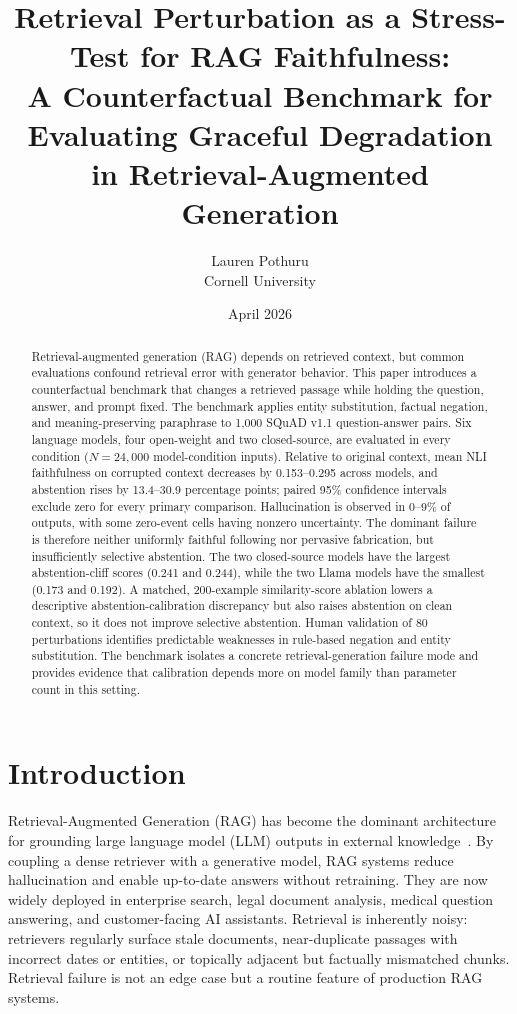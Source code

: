 \documentclass[11pt]{article}
\title{\textbf{Retrieval Perturbation as a Stress-Test for RAG Faithfulness:}\\
A Counterfactual Benchmark for Evaluating Graceful Degradation\\
in Retrieval-Augmented Generation}
\author{Lauren Pothuru\\Cornell University}
\date{April 2026}
\begin{document}
\maketitle

\FloatBarrier
\begin{abstract}
Retrieval-augmented generation (RAG) depends on retrieved context, but common evaluations
confound retrieval error with generator behavior. This paper introduces a counterfactual
benchmark that changes a retrieved passage while holding the question, answer, and prompt
fixed. The benchmark applies entity substitution, factual negation, and meaning-preserving
paraphrase to 1{,}000 SQuAD v1.1 question-answer pairs. Six language models, four
open-weight and two closed-source, are evaluated in every condition ($N=24{,}000$
model-condition inputs). Relative to original context, mean NLI faithfulness on corrupted
context decreases by 0.153--0.295 across models, and abstention rises by 13.4--30.9
percentage points; paired 95\% confidence intervals exclude zero for every primary
comparison. Hallucination is observed in 0--9\% of outputs, with some zero-event cells
having nonzero uncertainty. The dominant failure is therefore neither uniformly faithful
following nor pervasive fabrication, but insufficiently selective abstention. The two
closed-source models have the largest abstention-cliff scores (0.241 and 0.244), while
the two Llama models have the smallest (0.173 and 0.192). A matched, 200-example
similarity-score ablation lowers a descriptive abstention-calibration discrepancy but also
raises abstention on clean context, so it does not improve selective abstention. Human
validation of 80 perturbations identifies predictable weaknesses in rule-based negation
and entity substitution. The benchmark isolates a concrete retrieval-generation failure
mode and provides evidence that calibration depends more on model family than parameter
count in this setting.
\end{abstract}

\FloatBarrier
\section{Introduction}
\label{sec:intro}

Retrieval-Augmented Generation (RAG) has become the dominant architecture for grounding
large language model (LLM) outputs in external knowledge~\cite{lewis2020rag}. By coupling
a dense retriever with a generative model, RAG systems reduce hallucination and enable
up-to-date answers without retraining. They are now widely deployed in enterprise search,
legal document analysis, medical question answering, and customer-facing AI assistants.
Retrieval is inherently noisy: retrievers regularly surface stale documents,
near-duplicate passages with incorrect dates or entities, or topically adjacent but
factually mismatched chunks. Retrieval failure is not an edge case but a routine feature
of production RAG systems.
\end{document}
